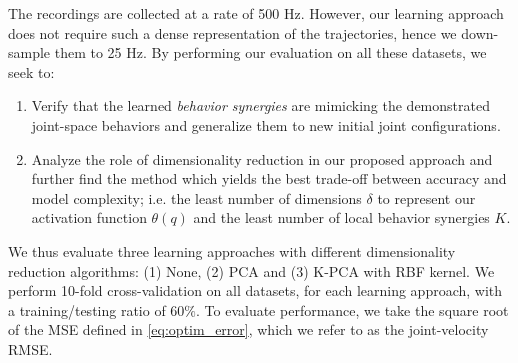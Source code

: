 \documentclass[letterpaper, 10 pt, conference,fleqn]{ieeeconf}
\begin{document}
\noindent   The recordings are collected at a rate of 500 Hz. However, our learning approach does not require such a dense representation of the trajectories, hence we down-sample them to 25 Hz. By performing our evaluation on all these datasets, we seek to: 

\begin{enumerate}[leftmargin=*]
\item Verify that the learned \textit{behavior synergies} are mimicking the demonstrated joint-space behaviors and generalize them to new initial joint configurations.
\item Analyze the role of dimensionality reduction in our proposed approach and further find the method which yields the best trade-off between accuracy and model complexity; i.e. the least number of dimensions $\delta$ to represent our activation function $\theta(q)$ and the least number of local behavior synergies $K$.
\end{enumerate}
We thus evaluate three learning approaches with different dimensionality reduction algorithms: (1) None, (2) PCA and (3) K-PCA with RBF kernel.
We perform 10-fold cross-validation on all datasets, for each learning approach, with a training/testing ratio of $60 \%$. To evaluate performance, we take the square root of the MSE defined in \eqref{eq:optim_error}, which we refer to as the joint-velocity RMSE. 
\end{document}
